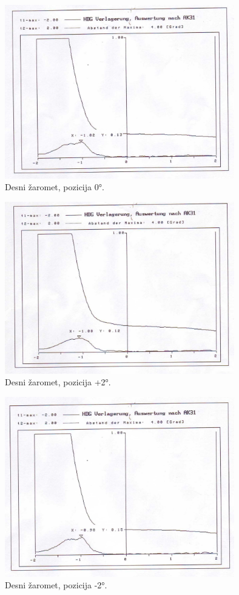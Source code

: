 \documentclass[oneside, a4paper, 12pt]{book}
\begin{document}
\begin{figure}
\begin{center}
\includegraphics[width=10cm]{slike/fotometer-desni-0.jpg}
\end{center}
\caption{Desni žaromet, pozicija 0°.}
\label{pic:opt-g}
\end{figure}

\begin{figure}
\begin{center}
\includegraphics[width=10cm]{slike/fotometer-desni-+2.jpg}
\end{center}
\caption{Desni žaromet, pozicija +2°.}
\label{pic:opt-g}
\end{figure}

\begin{figure}
\begin{center}
\includegraphics[width=10cm]{slike/fotometer-desni--2.jpg}
\end{center}
\caption{Desni žaromet, pozicija -2°.}
\label{pic:opt-g}
\end{figure}
\end{document}
